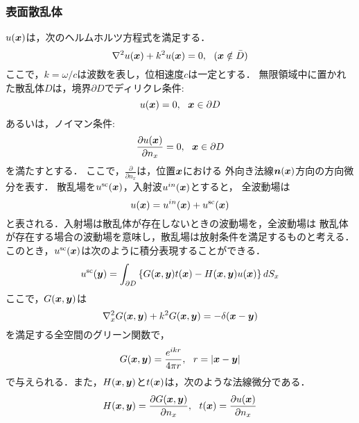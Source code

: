 \subsubsection{表面散乱体}
$u(\mbox{\boldmath $x$})$は，次のヘルムホルツ方程式を満足する．
\begin{equation}
	\nabla^2 u(\fat{x}) + k^2 u(\fat{x}) =0, \ \ (\fat{x} \notin \bar{D})
	\label{eqn:ZZZ_00}
\end{equation}
ここで，$k=\omega/c$は波数を表し，位相速度$c$は一定とする．
無限領域中に置かれた散乱体$D$は，境界$\partial D$でディリクレ条件: 
\begin{equation}
	u(\mbox{\boldmath $x$}) = 0, \ \ \mbox{\boldmath $x$}\in \partial D
	\label{eqn:ZZZ_01}
\end{equation}
あるいは，ノイマン条件:
\begin{equation}
	\frac{\partial u(\fat{x})}{\partial n_x} = 0 ,\ \ \fat{x}\in \partial D
	\label{eqn:ZZZ_02}
\end{equation}
を満たすとする．
ここで，$\frac{\partial }{\partial n_x}$は，位置$\mbox{\boldmath $x$}$における
外向き法線$\mbox{\boldmath $n$}(\mbox{\boldmath $x$})$方向の方向微分を表す．
散乱場を$u^{\rm sc}(\mbox{\boldmath $x$})$，入射波$u^{in}(\mbox{\boldmath $x$})$とすると，
全波動場は
\begin{equation}
	u(\mbox{\boldmath $x$})=u^{in}(\mbox{\boldmath $x$})+ u^{\rm sc}(\mbox{\boldmath $x$})
	\label{eqn:ZZZ_03}
\end{equation}
と表される．入射場は散乱体が存在しないときの波動場を，全波動場は
散乱体が存在する場合の波動場を意味し，散乱場は放射条件を満足するものと考える．
このとき，$u^{\rm sc}(\mbox{\boldmath $x$})$は次のように積分表現することができる．
\begin{equation}
	u^{\rm sc}(\mbox{\boldmath $y$}) = \int _{\partial D} 
	\left\{
		G(\mbox{\boldmath $x$},\mbox{\boldmath $y$})t(\mbox{\boldmath $x$})
	-
		H(\mbox{\boldmath $x$},\mbox{\boldmath $y$})u(\mbox{\boldmath $x$})
	\right\} dS_x
	\label{eqn:ZZZ_04}
\end{equation}
ここで，$G(\mbox{\boldmath $x$},\mbox{\boldmath $y$})$は
\begin{equation}
	\nabla_x^2 G(\mbox{\boldmath $x$},\mbox{\boldmath $y$}) + k^2 G(\mbox{\boldmath $x$},\mbox{\boldmath $y$}) =-\delta (\mbox{\boldmath $x$}-\mbox{\boldmath $y$} )
	\label{eqn:ZZZ_05}
\end{equation}
を満足する全空間のグリーン関数で，
\begin{equation}
	G(\fat{x},\fat{y}) =\frac{e^{ikr}}{4\pi r}, \ \ r=\left| \fat{x}-\fat{y} \right|
	\label{eqn:ZZZ_Green}
\end{equation}
で与えられる．また，$H(\mbox{\boldmath $x$},\mbox{\boldmath $y$})$と$t(\mbox{\boldmath $x$})$は，次のような法線微分である．
\begin{equation}
	H(\fat{x},\fat{y}) = \frac{\partial G(\fat{x},\fat{y})}{\partial n_x}, \ \ 
	t(\fat{x}) =\frac{\partial u(\fat{x})}{\partial n_x}
	\label{eqn:ZZZ_06}
\end{equation}
